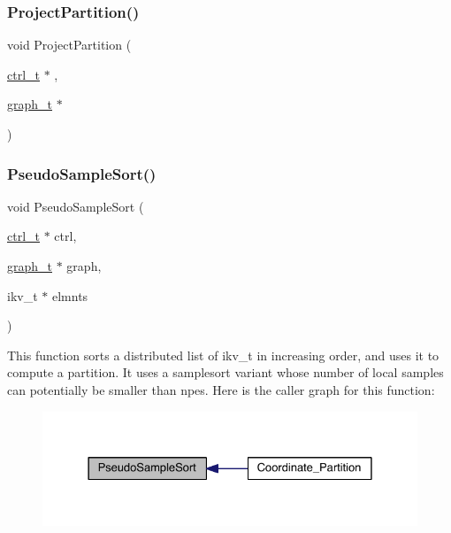 \mbox{\label{a00951_a0f8b027d5fc1b6a69795236ae73470b4}} 
\subsubsection{\texorpdfstring{Project\+Partition()}{ProjectPartition()}}
{\footnotesize\ttfamily void Project\+Partition (\begin{DoxyParamCaption}\item[{\hyperlink{a00742}{ctrl\+\_\+t} $\ast$}]{,  }\item[{\hyperlink{a00734}{graph\+\_\+t} $\ast$}]{ }\end{DoxyParamCaption})}

\mbox{\label{a00951_a5bcd0cf06b82d5985d0a29f3d96d5bfe}} 
\subsubsection{\texorpdfstring{Pseudo\+Sample\+Sort()}{PseudoSampleSort()}}
{\footnotesize\ttfamily void Pseudo\+Sample\+Sort (\begin{DoxyParamCaption}\item[{\hyperlink{a00742}{ctrl\+\_\+t} $\ast$}]{ctrl,  }\item[{\hyperlink{a00734}{graph\+\_\+t} $\ast$}]{graph,  }\item[{ikv\+\_\+t $\ast$}]{elmnts }\end{DoxyParamCaption})}

This function sorts a distributed list of ikv\+\_\+t in increasing order, and uses it to compute a partition. It uses a samplesort variant whose number of local samples can potentially be smaller than npes. Here is the caller graph for this function\+:\nopagebreak
\begin{figure}[H]
\begin{center}
\leavevmode
\includegraphics[width=328pt]{a00951_a5bcd0cf06b82d5985d0a29f3d96d5bfe_icgraph}
\end{center}
\end{figure}
\mbox{\label{a00951_a48483e0774d98abe224d43e75a208915}} 
